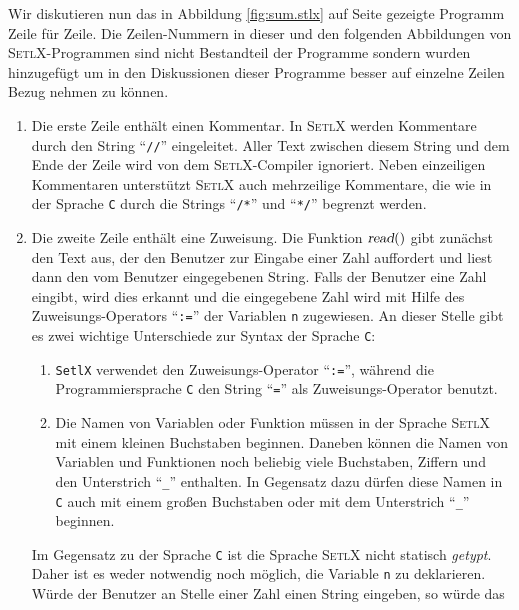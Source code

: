Wir diskutieren nun das in Abbildung \ref{fig:sum.stlx} auf Seite \pageref{fig:sum.stlx} gezeigte Programm
Zeile für Zeile.  Die Zeilen-Nummern in dieser und den folgenden Abbildungen von \textsc{SetlX}-Programmen
sind nicht Bestandteil der Programme sondern wurden hinzugefügt um in den Diskussionen
dieser Programme besser auf einzelne Zeilen Bezug nehmen zu können. 
\begin{enumerate}
\item Die erste Zeile enthält einen Kommentar.  In \textsc{SetlX} werden Kommentare
      durch den String ``\texttt{//}'' eingeleitet.  Aller Text zwischen diesem String und
      dem Ende der Zeile wird von dem \textsc{SetlX}-Compiler ignoriert.  Neben
      einzeiligen Kommentaren unterstützt \textsc{SetlX} auch mehrzeilige Kommentare, die
      wie in der Sprache \texttt{C} durch die Strings ``\texttt{/*}'' und ``\texttt{*/}''
      begrenzt werden.
\item Die zweite Zeile enthält eine Zuweisung.  Die Funktion $\textsl{read}()$ gibt
      zunächst den Text aus, der den Benutzer zur Eingabe einer Zahl auffordert und liest dann
      den vom Benutzer eingegebenen String.  Falls der Benutzer eine Zahl eingibt, wird
      dies erkannt und die eingegebene Zahl wird mit Hilfe des
      Zuweisungs-Operators ``\texttt{:=}'' der Variablen \texttt{n} zugewiesen.
      An dieser Stelle gibt es zwei wichtige Unterschiede zur Syntax der Sprache
      \texttt{C}:
      \begin{enumerate}
      \item \texttt{SetlX} verwendet den Zuweisungs-Operator ``\texttt{:=}'', während
            die Programmiersprache \texttt{C} den String ``\texttt{=}'' als
            Zuweisungs-Operator benutzt.
      \item Die Namen von Variablen oder Funktion müssen in der Sprache \textsc{SetlX} mit einem
            kleinen Buchstaben beginnen.  Daneben können die Namen von  Variablen und Funktionen
            noch beliebig viele Buchstaben, Ziffern und den Unterstrich ``\texttt{\_}'' enthalten.
            In Gegensatz dazu dürfen diese Namen in \texttt{C} auch mit einem großen
            Buchstaben oder mit dem Unterstrich ``\texttt{\_}'' beginnen.  
      \end{enumerate}
      Im Gegensatz zu der Sprache \texttt{C} ist die Sprache \textsc{SetlX} nicht statisch
      \emph{getypt}. Daher ist es weder notwendig noch möglich, die Variable \texttt{n} zu
      deklarieren.  Würde der Benutzer an Stelle einer Zahl einen String eingeben, so würde das

\end{enumerate}
